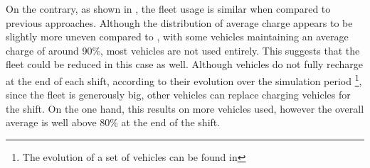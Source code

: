  On the contrary, as shown in , the fleet usage is similar when compared to previous approaches. Although the distribution of average charge appears to be slightly more uneven compared to  , with some vehicles maintaining an average charge of around 90\%, most vehicles are not used entirely. This suggests that the fleet could be reduced in this case as well. Although vehicles do not fully recharge at the end of each shift, according to their evolution over the simulation period \footnote{The evolution of a set of vehicles can be found in }, since the fleet is generously big, other vehicles can replace charging vehicles for the shift. On the one hand, this results on more vehicles used, however the overall average is well above 80\% at the end of the shift.  

